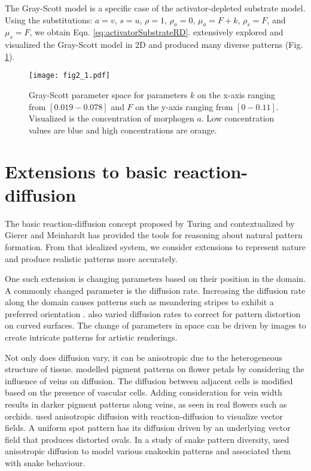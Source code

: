 The Gray-Scott model is a specific case of the activator-depleted substrate model. Using the substitutions: $a = v$, $s = u$, $\rho = 1$, $\rho_a = 0$, $\mu_a = F+k$, $\rho_s = F$, and $\mu_s = F$, we obtain Eqn. \ref{eq:activatorSubstrateRD}. \citet{pearson1993} extensively explored and visualized the Gray-Scott model in 2D and produced many diverse patterns (Fig. \ref{fig:grayscottParameterMap}). 

\begin{figure}[H]
	\centering
	\texttt{[image: fig2\_1.pdf]}
	\caption[Image of the Gray-Scott parameter space]{Gray-Scott parameter space for parameters $k$ on the x-axis ranging from $[0.019 - 0.078]$ and $F$ on the y-axis ranging from $[0 - 0.11]$. Visualized is the concentration of morphogen $a$. Low concentration values are blue and high concentrations are orange.}
	\label{fig:grayscottParameterMap}
\end{figure}

\section{Extensions to basic reaction-diffusion}
The basic reaction-diffusion concept proposed by Turing and contextualized by Gierer and Meinhardt has provided the tools for reasoning about natural pattern formation. From that idealized system, we consider extensions to represent nature and produce realistic patterns more accurately.

One such extension is changing parameters based on their position in the domain. A commonly changed parameter is the diffusion rate. Increasing the diffusion rate along the domain causes patterns such as meandering stripes to exhibit a preferred orientation \citep{zheng2009}. \citet{witkin1991} also varied diffusion rates to correct for pattern distortion on curved surfaces. The change of parameters in space can be driven by images to create intricate patterns for artistic renderings. 

Not only does diffusion vary, it can be anisotropic due to the heterogeneous structure of tissue. \citet{zhou2007} modelled pigment patterns on flower petals by considering the influence of veins on diffusion. The diffusion between adjacent cells is modified based on the presence of vascular cells. Adding consideration for vein width results in darker pigment patterns along veins, as seen in real flowers such as orchids. \citet{sanderson2004} used anisotropic diffusion with reaction-diffusion to visualize vector fields. A uniform spot pattern has its diffusion driven by an underlying vector field that produces distorted ovals. In a study of snake pattern diversity, \citet{allen2013} used anisotropic diffusion to model various snakeskin patterns and associated them with snake behaviour.

